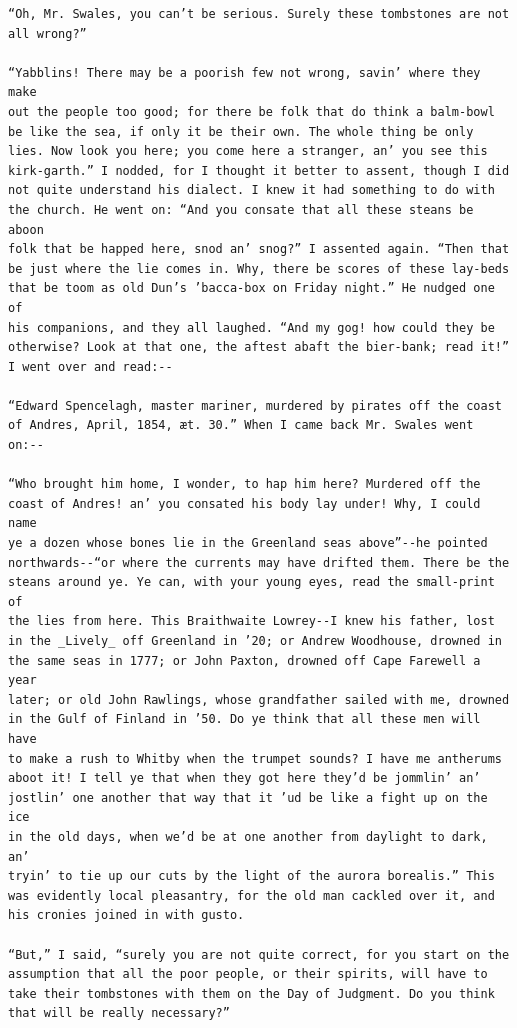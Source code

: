 \documentclass{article}
\begin{document}
\begin{verbatim}
“Oh, Mr. Swales, you can’t be serious. Surely these tombstones are not
all wrong?”

“Yabblins! There may be a poorish few not wrong, savin’ where they make
out the people too good; for there be folk that do think a balm-bowl
be like the sea, if only it be their own. The whole thing be only
lies. Now look you here; you come here a stranger, an’ you see this
kirk-garth.” I nodded, for I thought it better to assent, though I did
not quite understand his dialect. I knew it had something to do with
the church. He went on: “And you consate that all these steans be aboon
folk that be happed here, snod an’ snog?” I assented again. “Then that
be just where the lie comes in. Why, there be scores of these lay-beds
that be toom as old Dun’s ’bacca-box on Friday night.” He nudged one of
his companions, and they all laughed. “And my gog! how could they be
otherwise? Look at that one, the aftest abaft the bier-bank; read it!”
I went over and read:--

“Edward Spencelagh, master mariner, murdered by pirates off the coast
of Andres, April, 1854, æt. 30.” When I came back Mr. Swales went
on:--

“Who brought him home, I wonder, to hap him here? Murdered off the
coast of Andres! an’ you consated his body lay under! Why, I could name
ye a dozen whose bones lie in the Greenland seas above”--he pointed
northwards--“or where the currents may have drifted them. There be the
steans around ye. Ye can, with your young eyes, read the small-print of
the lies from here. This Braithwaite Lowrey--I knew his father, lost
in the _Lively_ off Greenland in ’20; or Andrew Woodhouse, drowned in
the same seas in 1777; or John Paxton, drowned off Cape Farewell a year
later; or old John Rawlings, whose grandfather sailed with me, drowned
in the Gulf of Finland in ’50. Do ye think that all these men will have
to make a rush to Whitby when the trumpet sounds? I have me antherums
aboot it! I tell ye that when they got here they’d be jommlin’ an’
jostlin’ one another that way that it ’ud be like a fight up on the ice
in the old days, when we’d be at one another from daylight to dark, an’
tryin’ to tie up our cuts by the light of the aurora borealis.” This
was evidently local pleasantry, for the old man cackled over it, and
his cronies joined in with gusto.

“But,” I said, “surely you are not quite correct, for you start on the
assumption that all the poor people, or their spirits, will have to
take their tombstones with them on the Day of Judgment. Do you think
that will be really necessary?”


\end{verbatim}
\end{document}
